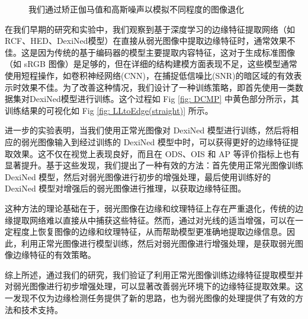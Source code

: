 \documentclass[a4paper]{ctexart}
\begin{document}
\begin{figure}[htbp]
\begin{minipage}{0.98\textwidth}
\begin{subfigure}{0.08\textwidth}
				\label{fig：Gamma=0.1, Gauss Noise = 1.0}
			\end{subfigure}
			\vspace{-10pt}
		\end{minipage}
			\caption{我们通过矫正伽马值和高斯噪声以模拟不同程度的图像退化}
			\label{fig: degraded}
		\end{figure}
		
		
		
		在我们早期的研究和实验中，我们观察到基于深度学习的边缘特征提取网络（如RCF、HED、DexiNed模型）在直接从弱光图像中提取边缘特征时，通常效果不佳。这是因为传统的基于编码器的模型主要提取内容特征，这对于生成标准图像（如 sRGB 图像）是足够的，但在详细的结构建模方面表现不足，这些模型通常使用短程操作，如卷积神经网络(CNN)，在捕捉低信噪比(SNR)的暗区域的有效表示时效果不佳。为了改善这种情况，我们设计了一种训练策略，即首先使用一类数据集对DexiNed模型进行训练。这个过程如 Fig \ref{fig: DCMP} 中黄色部分所示，其训练结果的可视化如 Fig \ref{fig: LLtoEdge(straight)} 所示。
		
		进一步的实验表明，当我们使用正常光图像对 DexiNed 模型进行训练，然后将相应的弱光图像输入到经过训练的 DexiNed 模型中时，可以获得更好的边缘特征提取效果。这不仅在视觉上表现良好，而且在 ODS、OIS 和 AP 等评价指标上也有显著提升。基于这些发现，我们提出了一种有效的方法：首先使用正常光图像训练 DexiNed 模型，然后对弱光图像进行初步的增强处理，最后使用训练好的 DexiNed 模型对增强后的弱光图像进行推理，以获取边缘特征图。
		
		这种方法的理论基础在于，弱光图像在边缘和纹理特征上存在严重退化，传统的边缘提取网络难以直接从中捕获这些特征。然而，通过对光线的适当增强，可以在一定程度上恢复图像的边缘和纹理特征，从而帮助模型更准确地提取边缘信息。因此，利用正常光图像进行模型训练，然后对弱光图像进行增强处理，是获取弱光图像边缘特征的有效策略。
		
		综上所述，通过我们的研究，我们验证了利用正常光图像训练边缘特征提取模型并对弱光图像进行初步增强处理，可以显著改善弱光环境下的边缘特征提取效果。这一发现不仅为边缘检测任务提供了新的思路，也为弱光图像的处理提供了有效的方法和技术支持。
		
\end{document}
